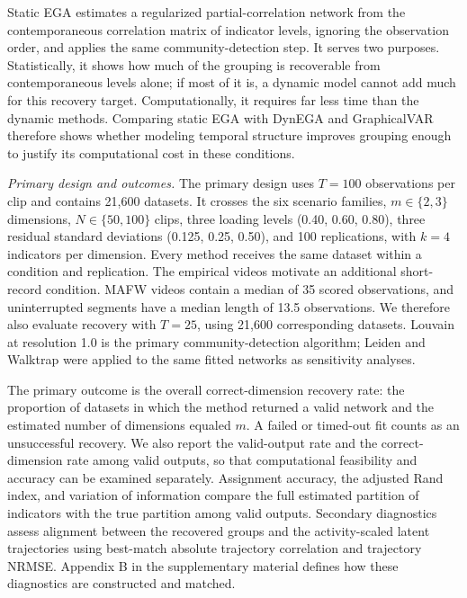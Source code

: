 \documentclass[
]{article}
\begin{document}
Static EGA estimates a regularized partial-correlation network from the
contemporaneous correlation matrix of indicator levels, ignoring the
observation order, and applies the same community-detection step. It
serves two purposes. Statistically, it shows how much of the grouping is
recoverable from contemporaneous levels alone; if most of it is, a
dynamic model cannot add much for this recovery target. Computationally,
it requires far less time than the dynamic methods. Comparing static EGA
with DynEGA and GraphicalVAR therefore shows whether modeling temporal
structure improves grouping enough to justify its computational cost in
these conditions.

\emph{Primary design and outcomes.} The primary design uses \(T=100\)
observations per clip and contains 21,600 datasets. It crosses the six
scenario families, \(m\in\{2,3\}\) dimensions, \(N\in\{50,100\}\) clips,
three loading levels (0.40, 0.60, 0.80), three residual standard
deviations (0.125, 0.25, 0.50), and 100 replications, with \(k=4\)
indicators per dimension. Every method receives the same dataset within
a condition and replication. The empirical videos motivate an additional
short-record condition. MAFW videos contain a median of 35 scored
observations, and uninterrupted segments have a median length of 13.5
observations. We therefore also evaluate recovery with \(T=25\), using
21,600 corresponding datasets. Louvain at resolution 1.0 is the primary
community-detection algorithm; Leiden and Walktrap were applied to the
same fitted networks as sensitivity analyses.

The primary outcome is the overall correct-dimension recovery rate: the
proportion of datasets in which the method returned a valid network and
the estimated number of dimensions equaled \(m\). A failed or timed-out
fit counts as an unsuccessful recovery. We also report the valid-output
rate and the correct-dimension rate among valid outputs, so that
computational feasibility and accuracy can be examined separately.
Assignment accuracy, the adjusted Rand index, and variation of
information compare the full estimated partition of indicators with the
true partition among valid outputs. Secondary diagnostics assess
alignment between the recovered groups and the activity-scaled latent
trajectories using best-match absolute trajectory correlation and
trajectory NRMSE. Appendix B in the supplementary material defines how
these diagnostics are constructed and matched.
\end{document}
